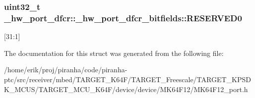 \subsubsection[{\texorpdfstring{R\+E\+S\+E\+R\+V\+E\+D0}{RESERVED0}}]{\setlength{\rightskip}{0pt plus 5cm}uint32\+\_\+t \+\_\+hw\+\_\+port\+\_\+dfcr\+::\+\_\+hw\+\_\+port\+\_\+dfcr\+\_\+bitfields\+::\+R\+E\+S\+E\+R\+V\+E\+D0}\hypertarget{struct__hw__port__dfcr_1_1__hw__port__dfcr__bitfields_a2276d06210214e4696e90a25474c6c0b}{}\label{struct__hw__port__dfcr_1_1__hw__port__dfcr__bitfields_a2276d06210214e4696e90a25474c6c0b}
\mbox{[}31\+:1\mbox{]} 

The documentation for this struct was generated from the following file\+:\begin{DoxyCompactItemize}
\item 
/home/erik/proj/piranha/code/piranha-\/ptc/src/receiver/mbed/\+T\+A\+R\+G\+E\+T\+\_\+\+K64\+F/\+T\+A\+R\+G\+E\+T\+\_\+\+Freescale/\+T\+A\+R\+G\+E\+T\+\_\+\+K\+P\+S\+D\+K\+\_\+\+M\+C\+U\+S/\+T\+A\+R\+G\+E\+T\+\_\+\+M\+C\+U\+\_\+\+K64\+F/device/device/\+M\+K64\+F12/M\+K64\+F12\+\_\+port.\+h\end{DoxyCompactItemize}
